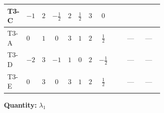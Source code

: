 \documentclass[8pt]{article}
\begin{document}
\begin{landscape}
\begin{longtable}{@{}llcccccc >{\raggedright\arraybackslash}p{0.21\linewidth} >{\raggedright\arraybackslash}p{0.21\linewidth} >{\raggedright\arraybackslash}p{0.21\linewidth}@{}}
T3-C & $-1$ & $2$ & $-\frac{1}{2}$ & $2$ & $\frac{1}{2}$ & $3$ & $0$ & \scriptsize\adjustbox{max width=\linewidth}{$\begin{gathered} -12 \operatorname{Tr}\!\left({Y_u}\,\left({Y_u}\right)^{\dagger}\,{Y_u}\,\left({Y_u}\right)^{\dagger}\right)\end{gathered}$} & \scriptsize\adjustbox{max width=\linewidth}{$\begin{gathered} +8 {\lambda_{7}} \left({\lambda_{7}}\right)^{*}\end{gathered}$} & \scriptsize\adjustbox{max width=\linewidth}{$\begin{gathered} +4 {\lambda_{H H^\dagger S_1^\dagger S_2^\dagger}^{\rm Cross}} \left({\lambda_{H H^\dagger S_1^\dagger S_2^\dagger}^{\rm Cross}}\right)^{*}\end{gathered}$} \\
\midrule
T3-A & $0$ & $1$ & $0$ & $3$ & $1$ & $2$ & $\frac{1}{2}$ & \scriptsize\adjustbox{max width=\linewidth}{$\begin{gathered} -12 \operatorname{Tr}\!\left({Y_u}\,\left({Y_u}\right)^{\dagger}\,{Y_u}\,\left({Y_u}\right)^{\dagger}\right)\end{gathered}$} & --- & --- \\
\midrule
T3-D & $-2$ & $3$ & $-1$ & $1$ & $0$ & $2$ & $-\frac{1}{2}$ & \scriptsize\adjustbox{max width=\linewidth}{$\begin{gathered} -12 \operatorname{Tr}\!\left({Y_u}\,\left({Y_u}\right)^{\dagger}\,{Y_u}\,\left({Y_u}\right)^{\dagger}\right)\end{gathered}$} & --- & --- \\
\midrule
T3-E & $0$ & $3$ & $0$ & $3$ & $1$ & $2$ & $\frac{1}{2}$ & \scriptsize\adjustbox{max width=\linewidth}{$\begin{gathered} -12 \operatorname{Tr}\!\left({Y_u}\,\left({Y_u}\right)^{\dagger}\,{Y_u}\,\left({Y_u}\right)^{\dagger}\right)\end{gathered}$} & --- & --- \\
\midrule
\bottomrule
\end{longtable}
\clearpage
\noindent\textbf{Quantity: }$\lambda_1$\par\smallskip

\end{landscape}
\end{document}
